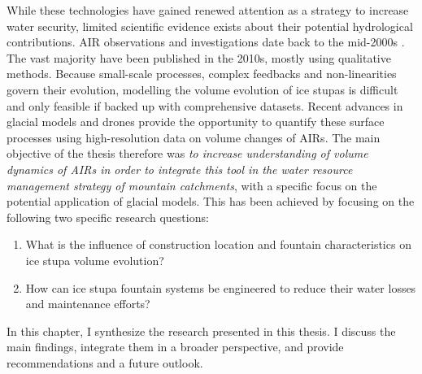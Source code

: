 While these technologies have gained renewed attention as a strategy to increase water security, limited
scientific evidence exists about their potential hydrological contributions. AIR observations and investigations
date back to the mid-2000s \citep{tveitenGlacierGrowingLocal2007}. The vast majority have been published in the
2010s, mostly using qualitative methods. Because small-scale processes, complex feedbacks and non-linearities
govern their evolution, modelling the volume evolution of ice stupas is difficult and only feasible if backed up
with comprehensive datasets. Recent advances in glacial models and drones provide the opportunity to quantify
these surface processes using high-resolution data on volume changes of \ac{AIRs}. The main objective of the
thesis therefore was \textit{to increase understanding of volume dynamics of \ac{AIRs} in order to integrate
this tool in the water resource management strategy of mountain catchments}, with a specific focus on the
potential application of glacial models. This has been achieved by focusing on the following two specific
research questions:

\begin{enumerate}
  \item{What is the influence of construction location and fountain characteristics on ice stupa volume
    evolution?}
  \item{How can ice stupa fountain systems be engineered to reduce their water losses and maintenance efforts?}
\end{enumerate}

In this chapter, I synthesize the research presented in this thesis. I discuss the main findings, integrate them
in a broader perspective, and provide recommendations and a future outlook.



